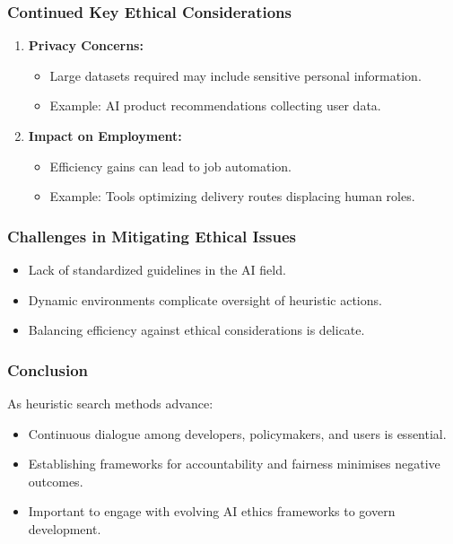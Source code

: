 \documentclass[aspectratio=169]{beamer}
\begin{document}
\begin{frame}[fragile]
    \frametitle{Continued Key Ethical Considerations}
    \begin{enumerate}[resume]
        \item \textbf{Privacy Concerns:}
            \begin{itemize}
                \item Large datasets required may include sensitive personal information.
                \item Example: AI product recommendations collecting user data.
            \end{itemize}

        \item \textbf{Impact on Employment:}
            \begin{itemize}
                \item Efficiency gains can lead to job automation.
                \item Example: Tools optimizing delivery routes displacing human roles.
            \end{itemize}
    \end{enumerate}
\end{frame}

\begin{frame}[fragile]
    \frametitle{Challenges in Mitigating Ethical Issues}
    \begin{itemize}
        \item Lack of standardized guidelines in the AI field.
        \item Dynamic environments complicate oversight of heuristic actions.
        \item Balancing efficiency against ethical considerations is delicate.
    \end{itemize}
\end{frame}

\begin{frame}[fragile]
    \frametitle{Conclusion}
    As heuristic search methods advance:
    \begin{itemize}
        \item Continuous dialogue among developers, policymakers, and users is essential.
        \item Establishing frameworks for accountability and fairness minimises negative outcomes.
        \item Important to engage with evolving AI ethics frameworks to govern development.
    \end{itemize}
\end{frame}
\end{document}
